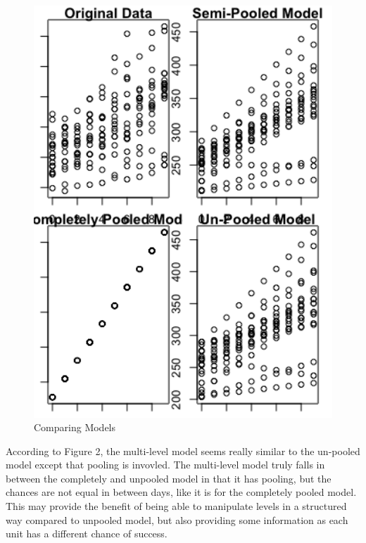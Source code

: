 \documentclass[12pt,letterpaper]{article}
\begin{document}
\begin{enumerate}
	\begin{figure}[h!]
		\caption{\footnotesize{Comparing Models}}
		\vspace{.5cm}
		\centering
		\label{fig:diagnosticplots}
		\includegraphics[width=1\textwidth]{./PS7_Plot_2.png}
	\end{figure}
	
	According to Figure 2, the multi-level model seems really similar to the un-pooled model except that pooling is invovled. The multi-level model truly falls in between the completely and unpooled model in that it has pooling, but the chances are not equal in between days, like it is for the completely pooled model. This may provide the benefit of being able to manipulate levels in a structured way compared to unpooled model, but also providing some information as each unit has a different chance of success.
	
	

\end{enumerate}
\end{document}

